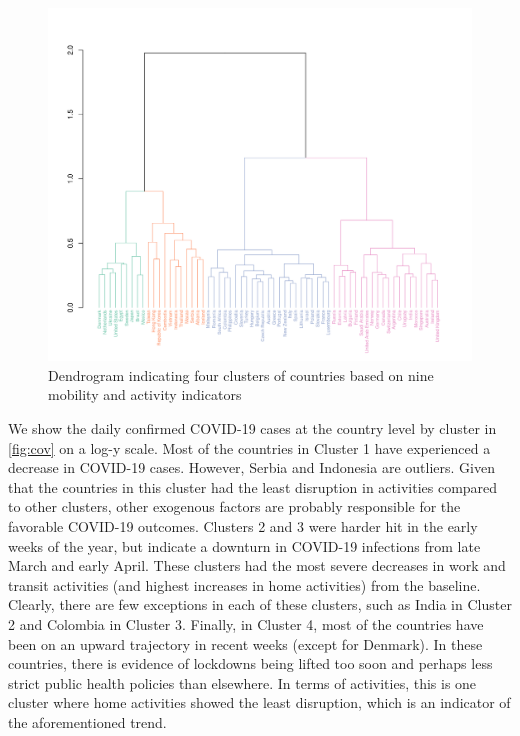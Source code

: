 \documentclass[titlepage,oneside,12pt]{article}
\newcommand{\?}{\stackrel{?}{=}}
\begin{document}
\begin{figure}[h!]
  \includegraphics[width=\textwidth,trim={0cm 0 1.9cm 7cm},clip]{dendrogram}
  \caption{Dendrogram indicating four clusters of countries based on nine mobility and activity indicators}
  \label{fig:dend}
\end{figure}

We show the daily confirmed COVID-19 cases at the country level by cluster in \autoref{fig:cov} on a log-y scale.
Most of the countries in Cluster 1 have experienced a decrease in COVID-19 cases.
However, Serbia and Indonesia are outliers.
Given that the countries in this cluster had the least disruption in activities compared to other clusters, other exogenous factors are probably responsible for the favorable COVID-19 outcomes.
Clusters 2 and 3 were harder hit in the early weeks of the year, but indicate a downturn in COVID-19 infections from late March and early April.
These clusters had the most severe decreases in work and transit activities (and highest increases in home activities) from the baseline.
Clearly, there are few exceptions in each of these clusters, such as India in Cluster 2 and Colombia in Cluster 3.
Finally, in Cluster 4, most of the countries have been on an upward trajectory in recent weeks (except for Denmark).
In these countries, there is evidence of lockdowns being lifted too soon and perhaps less strict public health policies than elsewhere.
In terms of activities, this is one cluster where home activities showed the least disruption, which is an indicator of the aforementioned trend.
\end{document}
